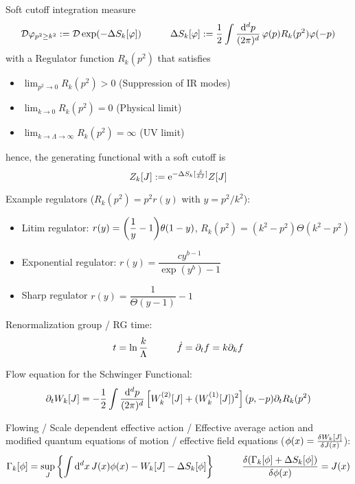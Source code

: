 		\noindent
		Soft cutoff integration measure
		\begin{equation}
			\mathcal{D}\varphi_{p^2 \ge k^2} := \mathcal{D} \exp(-\Delta S_k[\varphi])
			\hspace{30pt} \Delta S_k[\varphi] := \frac{1}{2} \int \frac{\dd^d p}{(2\pi)^d}\, \varphi(p)R_k(p^2) \varphi(-p)
		\end{equation}
		with a Regulator function $R_k(p^2)$ that satisfies
		\begin{itemize}\itemsep -0pt
			\item $\displaystyle\lim_{p^2 \to 0} R_k(p^2) > 0$ \hfill{(Suppression of IR modes)}
			\item $\displaystyle\lim_{k \to 0} R_k(p^2) = 0$ \hfill{(Physical limit)}
			\item $\displaystyle\lim_{k \to \Lambda \to \infty} R_k(p^2) = \infty$ \hfill{(UV limit)}
		\end{itemize}
		hence, the generating functional with a soft cutoff is
		\begin{equation}
			Z_k[J] := \ex^{-\Delta S_k [\fdv{J}]}Z[J]
		\end{equation}

		\noindent
		Example regulators ($R_k(p^2) = p^2 r(y)$ with $y=p^2/k^2$):
		\begin{itemize}
			\item Litim regulator: $r(y) = \qty(\dfrac{1}{y}-1)\theta(1-y)$, \ie $R_k(p^2) = (k^2 - p^2) \Theta(k^2 - p^2)$ \\
			\item Exponential regulator: $r(y) = \dfrac{cy^{b-1}}{\exp(y^b) - 1}$ \\
			\item Sharp regulator $r(y) = \dfrac{1}{\Theta(y-1)}-1$
		\end{itemize}

		\noindent
		Renormalization group / RG time:
		\begin{equation}
			t = \ln \frac{k}{\Lambda}
			\hspace{30pt} \dot{f} = \partial_t f = k \partial_k f
		\end{equation}

		\noindent
		Flow equation for the Schwinger Functional:
		\begin{equation}
			\partial_t W_k[J] = -\frac{1}{2}\int \frac{\dd^d p}{(2\pi)^d} \, \qty[W^{(2)}_k[J]+(W_k^{(1)}[J])^2](p,-p) \partial_t R_k(p^2)
		\end{equation}

		\noindent
		Flowing / Scale dependent effective action / Effective average action and modified quantum equations of motion / effective field equations ($\phi(x)= \fdv{W_k[J]}{J(x)}$):
		\begin{equation}
			\Gamma_k[\phi] = \sup_J \qty{\int \dd^d x\, J(x) \phi(x) - W_k[J] - \Delta S_k[\phi]}
			\hsp \fdv{(\Gamma_k[\phi] + \Delta S_k[\phi])}{\phi(x)} = J(x)
		\end{equation}

